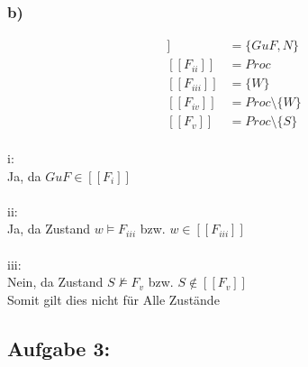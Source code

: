 \documentclass[10pt,a4paper,german,landscape,fleqn]{article} \usepackage[utf8]{inputenc} %
\newcommand{\auswf}[1]{[\![ #1 ]\!]}
\begin{document}
\subsubsection*{b)}
\begin{align*}
\auswf{F_i} &= \{GuF,N\} \\
\auswf{F_{ii}} &= Proc \\
\auswf{F_{iii}} &= \{W \} \\
\auswf{F_{iv}} &= Proc \setminus \{W\} \\
\auswf{F_{v}} &= Proc \setminus \{S\}
\end{align*}
\\
i:\\
Ja, da $GuF \in \auswf{F_i}$\\ \\
ii: \\
Ja, da Zustand $w \models F_{iii}$ bzw. $w \in \auswf{F_{iii}}$\\ \\
iii: \\
Nein, da Zustand  $S \nvDash F_v $ bzw. $S \notin \auswf{F_v} $ \\
Somit gilt dies nicht für Alle Zustände 
\newpage
\subsection*{Aufgabe 3:}


  \begin{minipage}{0.4\linewidth-7.112pt}
  \end{minipage}
\end{document}
